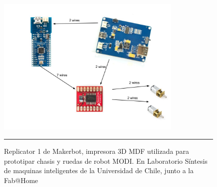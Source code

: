 \begin{figure}[htbp]
	\centering
		\includegraphics[width=0.8\textwidth]{./Figures/Diagrama.jpg}
		\rule{35em}{0.5pt}
	\caption[Replicator1]{Replicator 1 de Makerbot, impresora 3D MDF utilizada para prototipar chasis y ruedas de robot MODI. En Laboratorio Síntesis de maquinas inteligentes de la Universidad de Chile, junto a la Fab@Home}
	\label{fig:replicator}
\end{figure}	
